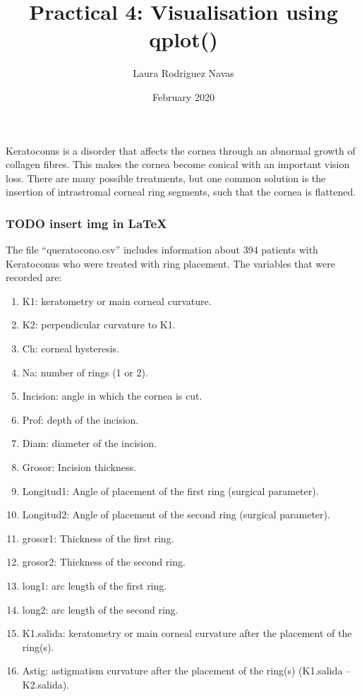 \documentclass[]{article}
\title{Practical 4: Visualisation using qplot()}
\author{Laura Rodriguez Navas}
\date{February 2020}
\providecommand{\tightlist}{%
  \setlength{\itemsep}{0pt}\setlength{\parskip}{0pt}}
\begin{document}
\maketitle

Keratoconus is a disorder that affects the cornea through an abnormal
growth of collagen fibres. This makes the cornea become conical with an
important vision loss. There are many possible treatments, but one
common solution is the insertion of intrastromal corneal ring segments,
such that the cornea is flattened.

\hypertarget{todo-insert-img-in-latex}{%
\subsubsection{TODO insert img in
LaTeX}\label{todo-insert-img-in-latex}}

The file ``queratocono.csv'' includes information about 394 patients
with Keratoconus who were treated with ring placement. The variables
that were recorded are:

\begin{enumerate}
\def\labelenumi{\arabic{enumi}.}
\tightlist
\item
  K1: keratometry or main corneal curvature.
\item
  K2: perpendicular curvature to K1.
\item
  Ch: corneal hysteresis.
\item
  Na: number of rings (1 or 2).
\item
  Incision: angle in which the cornea is cut.
\item
  Prof: depth of the incision.
\item
  Diam: diameter of the incision.
\item
  Grosor: Incision thickness.
\item
  Longitud1: Angle of placement of the first ring (surgical parameter).
\item
  Longitud2: Angle of placement of the second ring (surgical parameter).
\item
  grosor1: Thickness of the first ring.
\item
  grosor2: Thickness of the second ring.
\item
  long1: arc length of the first ring.
\item
  long2: arc length of the second ring.
\item
  K1.salida: keratometry or main corneal curvature after the placement
  of the ring(s).
\item
  Astig: astigmatism curvature after the placement of the ring(s)
  (K1.salida -- K2.salida).
\end{enumerate}
\end{document}
